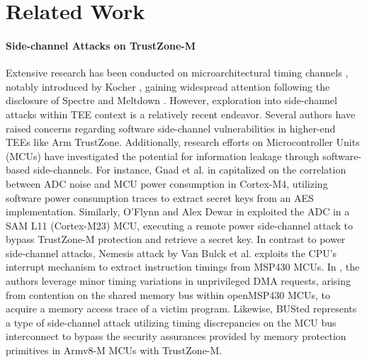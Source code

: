 \section{Related Work}\label{sec:related3}

\paragraph{\textbf{Side-channel Attacks on TrustZone-M}}
%
Extensive research has been conducted on microarchitectural timing channels
\cite{timingattack}, notably introduced by Kocher \cite{Kocher96}, gaining
widespread attention following the disclosure of Spectre \cite{spectre} and
Meltdown \cite{meltdown}. However, exploration into side-channel attacks
within TEE context is a relatively recent endeavor.  Several authors
\cite{loadstep, truspy, Bypassed, Qualcomm, vanbulckphdthesis,
gross2019breaking, surveyonTEE} have raised concerns regarding software
side-channel vulnerabilities in higher-end TEEs like Arm TrustZone.
Additionally, research efforts on Microcontroller Units (MCUs)
\cite{Nemesis, marton, busted, returntononsecure, oflynn2019ondevice,
barenghi2021cortexm, gnad2019leakynoise} have investigated the potential
for information leakage through software-based side-channels. For instance,
Gnad et al. in \cite{gnad2019leakynoise} capitalized on the correlation
between ADC noise and MCU power consumption in Cortex-M4, utilizing
software power consumption traces to extract secret keys from an AES
implementation. Similarly, O'Flynn and Alex Dewar in
\cite{oflynn2019ondevice} exploited the ADC in a SAM L11 (Cortex-M23) MCU,
executing a remote power side-channel attack to bypass TrustZone-M
protection and retrieve a secret key. In contrast to power side-channel
attacks, Nemesis attack by Van Bulck et al. \cite{Nemesis} exploits the
CPU's interrupt mechanism to extract instruction timings from MSP430 MCUs.
In \cite{marton}, the authors leverage minor timing variations in
unprivileged DMA requests, arising from contention on the shared memory bus
within openMSP430 MCUs, to acquire a memory access trace of a victim
program. Likewise, BUSted \cite{busted} represents a type of side-channel
attack utilizing timing discrepancies on the MCU bus interconnect to bypass
the security assurances provided by memory protection primitives in Armv8-M
MCUs with TrustZone-M.
 
